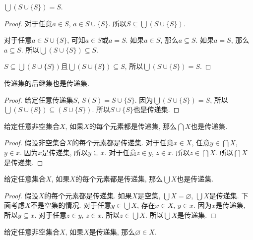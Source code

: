 \begin{proposition}
	$\bigcup (S\cup \{S\})=S$.
\end{proposition}

\begin{proof}
	对于任意$a\in S$, $a\in S\cup \{S\}$. 所以$S\subseteq \bigcup (S\cup \{S\})$.
	
	对于任意$a\in S\cup \{S\}$, 可知$a\in S$或$a=S$. 如果$a\in S$, 那么$a\subseteq S$. 如果$a=S$, 那么$a\subseteq S$. 所以$\bigcup (S\cup \{S\})\subseteq S$.
	
	$S\subseteq \bigcup (S\cup \{S\})$且$\bigcup (S\cup \{S\})\subseteq S$, 所以$\bigcup (S\cup \{S\})=S$.
\end{proof}

\begin{proposition}
	传递集的后继集也是传递集.
\end{proposition}

\begin{proof}
	给定任意传递集$S$, $S(S)=S\cup \{S\}$. 因为$\bigcup (S\cup \{S\})=S$, 所以$\bigcup (S\cup \{S\})\subseteq (S\cup \{S\})$. 所以$S\cup \{S\}$也是传递集.
\end{proof}

\begin{proposition}
	给定任意非空集合$X$, 如果$X$的每个元素都是传递集, 那么$\bigcap X$也是传递集.
\end{proposition}

\begin{proof}
	假设非空集合$X$的每个元素都是传递集. 对于任意$x\in X$, 任意$y\in \bigcap X$, $y\in x$. 因为$x$是传递集, 所以$y\subseteq x$. 对于任意$z\in y$, $z\in x$. 所以$z\in \bigcap X$. 所以$\bigcap X$是传递集.
\end{proof}

\begin{proposition}
	给定任意集合$X$, 如果$X$的每个元素都是传递集, 那么$\bigcup X$也是传递集.
\end{proposition}

\begin{proof}
	假设$X$的每个元素都是传递集. 如果$X$是空集, $\bigcup X=\varnothing$, $\bigcup X$是传递集. 下面考虑$X$不是空集的情况. 对于任意$y\in \bigcup X$, 存在$x\in X$, $y\in x$. 因为$x$是传递集, 所以$y\subseteq x$. 对于任意$z\in y$, $z\in x$. 所以$z\in \bigcup X$. 所以$\bigcup X$是传递集.
\end{proof}

\begin{proposition}
	给定任意非空集合$X$, 如果$X$是传递集, 那么$\varnothing \in X$.
\end{proposition}

